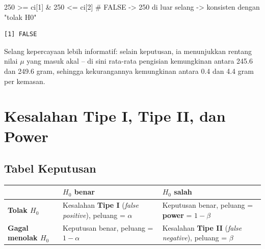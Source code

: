 \documentclass[
  indonesian,
  letterpaper,
]{book}
\newenvironment{Shaded}{\begin{snugshade}}{\end{snugshade}}
\newcommand{\CommentTok}[1]{\textcolor[rgb]{0.37,0.37,0.37}{#1}}
\newcommand{\DecValTok}[1]{\textcolor[rgb]{0.68,0.00,0.00}{#1}}
\newcommand{\NormalTok}[1]{\textcolor[rgb]{0.00,0.23,0.31}{#1}}
\newcommand{\SpecialCharTok}[1]{\textcolor[rgb]{0.37,0.37,0.37}{#1}}
\newcounter{none} %
\begin{document}
\begin{Shaded}
\begin{Highlighting}[]
\DecValTok{250} \SpecialCharTok{\textgreater{}=}\NormalTok{ ci[}\DecValTok{1}\NormalTok{] }\SpecialCharTok{\&} \DecValTok{250} \SpecialCharTok{\textless{}=}\NormalTok{ ci[}\DecValTok{2}\NormalTok{]   }\CommentTok{\# FALSE {-}\textgreater{} 250 di luar selang {-}\textgreater{} konsisten dengan "tolak H0"}
\end{Highlighting}
\end{Shaded}

\begin{verbatim}
[1] FALSE
\end{verbatim}

Selang kepercayaan lebih informatif: selain keputusan, ia menunjukkan
rentang nilai \(\mu\) yang masuk akal -- di sini rata-rata pengisian
kemungkinan antara 245.6 dan 249.6 gram, sehingga kekurangannya
kemungkinan antara 0.4 dan 4.4 gram per kemasan.


\chapter{Kesalahan Tipe I, Tipe II, dan
Power}\label{kesalahan-tipe-i-tipe-ii-dan-power}

\section{Tabel Keputusan}\label{tabel-keputusan}

{\def\LTcaptype{none} %
\begin{longtable}[]{@{}
  >{\raggedright\arraybackslash}p{}
  >{\raggedright\arraybackslash}p{}
  >{\raggedright\arraybackslash}p{}@{}}
\toprule\noalign{}
\begin{minipage}[b]{\linewidth}\raggedright
\end{minipage} & \begin{minipage}[b]{\linewidth}\raggedright
\(H_0\) benar
\end{minipage} & \begin{minipage}[b]{\linewidth}\raggedright
\(H_0\) salah
\end{minipage} \\
\midrule\noalign{}
\endhead
\bottomrule\noalign{}
\endlastfoot
\textbf{Tolak \(H_0\)} & Kesalahan \textbf{Tipe I} (\emph{false
positive}), peluang = \(\alpha\) & Keputusan benar, peluang =
\textbf{power} = \(1-\beta\) \\
\textbf{Gagal menolak \(H_0\)} & Keputusan benar, peluang = \(1-\alpha\)
& Kesalahan \textbf{Tipe II} (\emph{false negative}), peluang =
\(\beta\) \\
\end{longtable}
}
\end{document}
